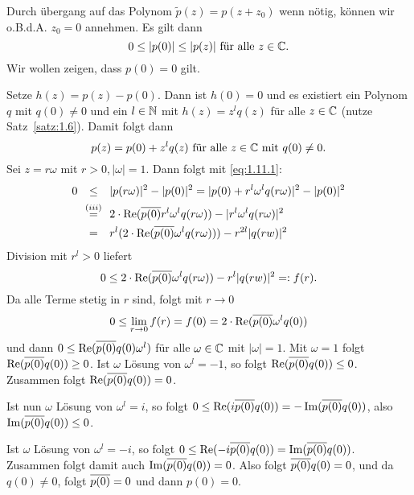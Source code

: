 \begin{beweis}
	Durch übergang auf das Polynom $\tilde{p}(z) = p(z+z_0)$ wenn nötig, können wir o.B.d.A. $z_0 = 0$ annehmen.
	Es gilt dann
	\begin{equation}
		0 \leq |p(0)| \leq |p(z)| \text{ für alle } z \in \mathbb{C}. \label{eq:1.11.1}
	\end{equation}
	Wir wollen zeigen, dass $p(0) = 0$ gilt.
	
	Setze $h(z) = p(z) - p(0)$.
	Dann ist $h(0) = 0$ und es existiert ein Polynom $q$ mit $q(0) \neq 0$ und ein $l \in \mathbb{N}$ mit $h(z) = z^{l} q(z)$ für alle $z \in \mathbb{C}$ (nutze Satz~\ref{satz:1.6}).
	Damit folgt dann
	\[
		p(z) = p(0) + z^{l}q(z) \text{ für alle } z \in \mathbb{C} \text{ mit } q(0) \neq 0.
	\]
	Sei $z = r \omega$ mit $r > 0, |\omega| = 1$.
	Dann folgt mit \eqref{eq:1.11.1}:
	\begin{align*}
		0 &\stack{}{\leq} |p(r \omega)|^2 - |p(0)|^2 = |p(0) + r^{l}\omega^{l}q(r\omega)|^2 - |p(0)|^2 \\
		&\stack{(iii)}{=} 2 \cdot \Re(\ol{p(0)} r^{l} \omega^{l} q(r\omega)) - |r^l \omega^{l} q(r\omega)|^2 \\
		&\stack{}{=} r^{l} (2\cdot \Re(\ol{p(0)} \omega^{l}q(r\omega))) - r^{2l} |q(rw)|^2
	\end{align*}
	Division mit $r^{l} > 0$ liefert
	\[
		0 \leq 2 \cdot \operatorname{Re}(\overline{p(0)}\omega^{l} q(r\omega)) - r^{l} |q(rw)|^2 =: f(r).
	\]
	Da alle Terme stetig in $r$ sind, folgt mit $r \rightarrow 0$
	\[
		0 \leq \lim\limits_{r \rightarrow 0} f(r) = f(0) = 2 \cdot \operatorname{Re}(\overline{p(0)} \omega^l q(0))
	\]
	und dann $0 \leq \operatorname{Re}(\overline{p(0)}q(0) \omega^l)$ für alle $\omega \in \mathbb{C}$ mit $|\omega| = 1$.
	Mit $\omega = 1$ folgt $\operatorname{Re}(\overline{p(0)}q(0)) \geq 0$.
	Ist $\omega$ Lösung von $\omega^l = -1$, so folgt $\operatorname{Re}(\overline{p(0)}q(0)) \leq 0$.
	Zusammen folgt $\operatorname{Re}(\overline{p(0)}q(0))=0$.
	
	Ist nun $\omega$ Lösung von $\omega^l=i$, so folgt $0 \leq \operatorname{Re}(i \overline{p(0)} q(0)) = -\operatorname{Im}(\overline{p(0)}q(0))$, also $\operatorname{Im}(\overline{p(0)}q(0)) \leq 0$.
	
	Ist $\omega$ Lösung von $\omega^l = -i$, so folgt $0 \leq \operatorname{Re}(-i \overline{p(0)} q(0)) = \operatorname{Im}(\overline{p(0)}q(0))$.
	Zusammen folgt damit auch $\operatorname{Im}(\overline{p(0)}q(0)) = 0$.
	Also folgt $\overline{p(0)}q(0)=0$, und da $q(0) \neq 0$, folgt $\overline{p(0)} = 0$ und dann $p(0) = 0$. 
\end{beweis}
\cleardoubleoddemptypage